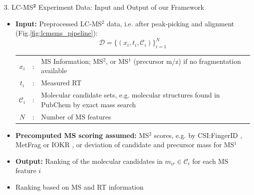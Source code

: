 \documentclass{beamer}
\newcommand{\ms}{MS}
\newcommand{\lc}{LC}
\newcommand{\msone}{\ms$^1$}
\newcommand{\msms}{\ms$^2$}
\newcommand{\lcms}{\lc-\ms}
\newcommand{\lcmsms}{\lc-\msms}
\newcommand{\spec}{x}
\newcommand{\rt}{t}
\newcommand{\cands}{\mathcal{C}}
\newcommand{\seqlength}{N}
\begin{document}
\begin{frame}{}
\begin{columns}[T]
    \begin{block}{{\normalsize 3. \lcms$^\mathbf{2}$ Experiment Data: Input and Output of our Framework}}
    \begin{itemize}
        \item \textbf{Input:} Preprocessed \lcmsms{} data, i.e. after peak-picking and alignment (Fig.\ref{fig:lcmsms_pipeline}):
        \vspace{0.15cm}
            \begin{equation}
                \mathcal{D}=\{(\spec_i,\rt_i,\cands_i)\}_{i=1}^\seqlength
            \end{equation}
        \begin{tabularx}{\textwidth}{ccX}
            $\spec_i$ & : & \ms{} Information; \msms{}, or \msone{} (precursor m/z) if no fragmentation available \\
            $\rt_i$ & : & Measured RT \\
            $\cands_i$ & : & {Molecular candidate sets, e.g. molecular structures found in PubChem by \newline exact mass search} \\
            $\seqlength$ & : & Number of \ms{} features   \\
        \end{tabularx}
        \item \textbf{Precomputed \ms{} scoring assumed:} \msms{} scores, e.g. by CSI:FingerID \cite{Duehrkop2019}, MetFrag \cite{Ruttkies2016} or IOKR \cite{Brouard_ismb_2016}, or deviation of candidate and precursor mass for \msone{}
        \item \textbf{Output:} Ranking of the molecular candidates in $m_{ir}\in\mathcal{C}_i$ for each \ms{} feature $i$
        \item Ranking based on \ms{} and RT information
    \end{itemize}
    \vspace{-0.35cm}
    \end{block}



\end{columns}
\end{frame}
\end{document}
